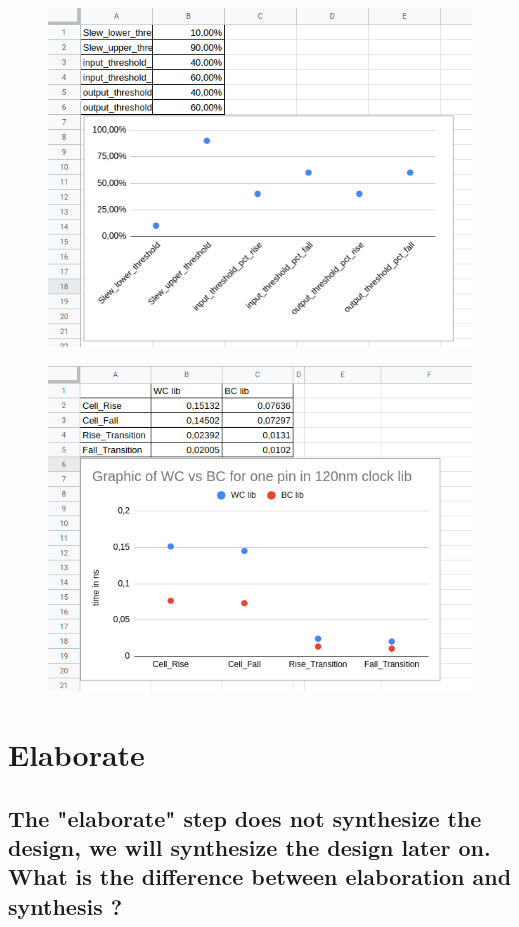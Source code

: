\documentclass[11pt,a4paper,sans,dvipsnames]{report}
\begin{document}
	\begin{figure}[h!]
		\centering
		\includegraphics[width=.57\linewidth, frame]{images/slew_graph.png}

		\label{fig:slew_graph}
	\end{figure}%

	\begin{figure}[h!]
		\centering
		\includegraphics[width=0.57\linewidth, frame]{images/delay_graph.png}
		\label{fig:delay_graph}
	\end{figure}

	\newpage
	\section{Elaborate}
	\subsection*{The "elaborate" step does not synthesize the design, we will synthesize the design later on. What
		is the difference between elaboration and synthesis ?}
\end{document}
